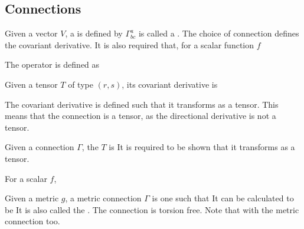 \documentclass{article}
\begin{document}
\subsection{Connections}

\begin{definition}
Given a vector $V$, a  is defined by 
$\Gamma^a_{bc}$ is called a . The choice of connection defines the covariant derivative. It is also required that, for a scalar function $f$
\end{definition}

\begin{definition}[Laplacian]
The  operator is defined as 
\end{definition}

\begin{lemma}
Given a tensor $T$ of type $(r,s)$, its covariant derivative is 
\end{lemma}

\begin{idea}
The covariant derivative is defined such that it transforms as a tensor. This means that the connection is  a tensor, as the directional derivative is not a tensor. 
\end{idea}

\begin{definition}
Given a connection $\Gamma$, the  $T$ is 
It is required to be shown that it transforms as a tensor. 
\end{definition}

\begin{lemma}
For a scalar $f$,
\end{lemma}

\begin{definition}
Given a metric $g$, a metric connection $\Gamma$ is one such that 
It can be calculated to be 
It is also called the . The connection is torsion free. Note that with the metric connection
too. 
\end{definition}
\end{document}
